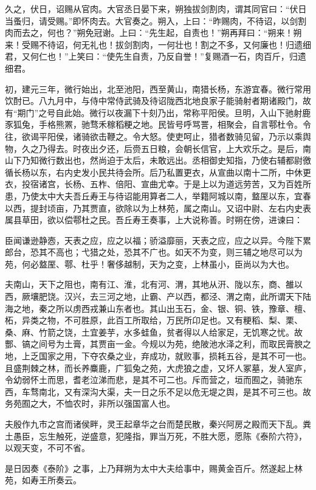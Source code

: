 \documentclass[]{article}
\begin{document}
久之，伏日，诏赐从官肉。大官丞日晏下来，朔独拔剑割肉，谓其同官曰：``伏日当蚤归，请受赐。''即怀肉去。大官奏之。朔入，上曰：``昨赐肉，不待诏，以剑割肉而去之，何也？''朔免冠谢。上曰：``先生起，自责也！''朔再拜曰：``朔来！朔来！受赐不待诏，何无礼也！拔剑割肉，一何壮也！割之不多，又何廉也！归遗细君，又何仁也！''上笑曰：``使先生自责，乃反自誉！''复赐酒一石，肉百斤，归遗细君。

初，建元三年，微行始出，北至池阳，西至黄山，南猎长杨，东游宜春。微行常用饮酎已。八九月中，与侍中常侍武骑及待诏陇西北地良家子能骑射者期诸殿门，故有``期门''之号自此始。微行以夜漏下十刻乃出，常称平阳侯。旦明，入山下驰射鹿豕狐兔，手格熊罴，驰骛禾稼稻粳之地。民皆号呼骂詈，相聚会，自言鄠杜令。令往，欲谒平阳侯，诸骑欲击鞭之。令大怒。使吏呵止，猎者数骑见留，乃示以乘舆物，久之乃得去。时夜出夕还，后赍五日粮，会朝长信官，上大欢乐之。是后，南山下乃知微行数出也，然尚迫于太后，未敢远出。丞相御史知指，乃使右辅都尉徼循长杨以东，右内史发小民共待会所。后乃私置更衣，从宣曲以南十二所，中休更衣，投宿诸宫，长杨、五柞、倍阳、宣曲尤幸。于是上以为道远劳苦，又为百姓所患，乃使太中大夫吾丘寿王与待诏能用算者二人，举籍阿城以南，盩厔以东，宜春以西，提封顷亩，乃其贾直，欲除以为上林苑，属之南山。又诏中尉、左右内史表属县草田，欲以偿鄠杜之民。吾丘寿王奏事，上大说称善。时朔在傍，进谏曰：

臣闻谦逊静悫，天表之应，应之以福；骄溢靡丽，天表之应，应之以异。今陛下累郎台，恐其不高也；弋猎之处，恐其不广也。如天不为变，则三辅之地尽可以为苑，何必盩厔、鄠、杜乎！奢侈越制，天为之变，上林虽小，臣尚以为大也。

夫南山，天下之阻也，南有江、淮，北有河、渭，其地从汧、陇以东，商、雒以西，厥壤肥饶。汉兴，去三河之地，止霸、产以西，都泾、渭之南，此所谓天下陆海之地，秦之所以虏西戎兼山东者也。其山出玉石，金、银、铜、铁，豫章、檀、柘，异类之物，不可胜原，此百工所取给，万民所卬足也。又有粳稻、梨、栗、桑、麻、竹箭之饶，土宜姜芋，水多蛙鱼，贫者得以人给家足，无饥寒之忧。故酆、镐之间号为土膏，其贾亩一金。今规以为苑，绝陂池水泽之利，而取民膏腴之地，上乏国家之用，下夺农桑之业，弃成功，就败事，损耗五谷，是其不可一也。且盛荆棘之林，而长养麋鹿，广狐兔之苑，大虎狼之虚，又坏人冢墓，发人室庐，令幼弱怀土而思，耆老泣涕而悲，是其不可二也。斥而营之，垣而囿之，骑驰东西，车骛南北，又有深沟大渠，夫一日之乐不足以危无堤之舆，是其不可三也。故务苑囿之大，不恤农时，非所以强国富人也。

夫殷作九市之宫而诸侯畔，灵王起章华之台而楚民散，秦兴阿房之殿而天下乱。粪土愚臣，忘生触死，逆盛意，犯隆指，罪当万死，不胜大愿，愿陈《泰阶六符》，以观天变，不可不省。

是日因奏《泰阶》之事，上乃拜朔为太中大夫给事中，赐黄金百斤。然遂起上林苑，如寿王所奏云。
\end{document}
